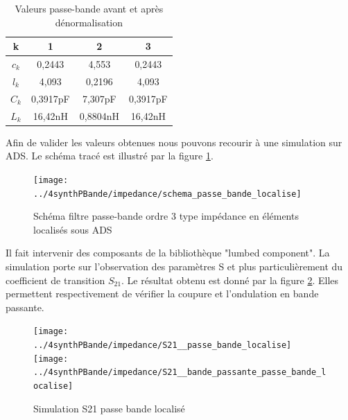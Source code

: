 \documentclass[french]{article}
\begin{document}
\begin{table}[H]
	\centering
	\begin{tabular}{|c|c|c|c|}
		\hline
		k & 1 & 2 & 3 \\
		\hline
		$c_k$ & 0,2443 & 4,553 & 0,2443 \\ \hline
		$l_k$ &	4,093	&	0,2196	&	4,093	\\ \hline
		$C_k$ &	0,3917pF&	7,307pF	&	0,3917pF\\ \hline
		$L_k$ &	16,42nH	&	0,8804nH& 16,42nH	\\ \hline
	\end{tabular}
	\caption{Valeurs passe-bande avant et après dénormalisation}
	\label{tab:denorm_BP}
\end{table}
Afin de valider les valeurs obtenues nous pouvons recourir à une simulation sur ADS. Le schéma tracé est illustré par la figure \ref{fig:ads_sch_BP_localise}.
\begin{figure}[H]
	\centering
	\texttt{[image: ../4synthPBande/impedance/schema\_passe\_bande\_localise]}
	\caption{Schéma filtre passe-bande ordre 3 type impédance en éléments localisés sous ADS}
	\label{fig:ads_sch_BP_localise}
\end{figure}
Il fait intervenir des composants de la bibliothèque "lumbed component". La simulation porte sur l'observation des paramètres S et plus particulièrement du coefficient de transition $S_{21}$. Le résultat obtenu est donné par la figure \ref{fig:ads_S21_BP_localise1}. Elles permettent respectivement de vérifier la coupure et l'ondulation en bande passante.
\begin{figure}[H]
	\centering
	\texttt{[image: ../4synthPBande/impedance/S21\_\_passe\_bande\_localise]}
	\texttt{[image: ../4synthPBande/impedance/S21\_\_bande\_passante\_passe\_bande\_localise]}
	\caption{Simulation S21 passe bande localisé}
	\label{fig:ads_S21_BP_localise1}
\end{figure}
\end{document}
